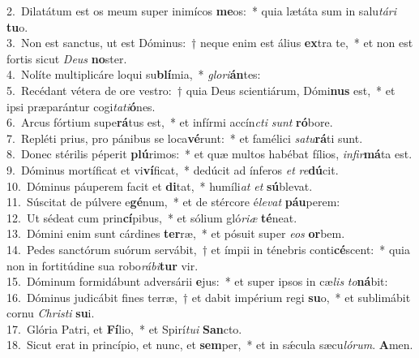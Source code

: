 {2.~}Dilatátum est os meum super inimícos \textbf{me}os:~* quia lætáta sum in salu\textit{tá}\textit{ri} \textbf{tu}o.\\
{3.~}Non est sanctus, ut est Dóminus:~† neque enim est álius \textbf{ex}tra te,~* et non est fortis sicut \textit{De}\textit{us} \textbf{no}ster.\\
{4.~}Nolíte multiplicáre loqui su\textbf{blí}mia,~* \textit{glo}\textit{ri}\textbf{án}tes:\\
{5.~}Recédant vétera de ore vestro:~† quia Deus scientiárum, Dómi\textbf{nus} est,~* et ipsi præparántur cogi\textit{ta}\textit{ti}\textbf{ó}nes.\\
{6.~}Arcus fórtium supe\textbf{rá}tus est,~* et infírmi accín\textit{cti} \textit{sunt} \textbf{ró}bore.\\
{7.~}Repléti prius, pro pánibus se loca\textbf{vé}runt:~* et famélici \textit{sa}\textit{tu}\textbf{rá}ti sunt.\\
{8.~}Donec stérilis péperit \textbf{plú}rimos:~* et quæ multos habébat fílios, \textit{in}\textit{fir}\textbf{má}ta est.\\
{9.~}Dóminus mortíficat et vi\textbf{ví}ficat,~* dedúcit ad ínferos \textit{et} \textit{re}\textbf{dú}cit.\\
{10.~}Dóminus páuperem facit et \textbf{di}tat,~* humíli\textit{at} \textit{et} \textbf{sú}blevat.\\
{11.~}Súscitat de púlvere e\textbf{gé}num,~* et de stércore é\textit{le}\textit{vat} \textbf{páu}perem:\\
{12.~}Ut sédeat cum prin\textbf{cí}pibus,~* et sólium gló\textit{ri}\textit{æ} \textbf{té}neat.\\
{13.~}Dómini enim sunt cárdines \textbf{ter}ræ,~* et pósuit super \textit{e}\textit{os} \textbf{or}bem.\\
{14.~}Pedes sanctórum suórum servábit,~† et ímpii in ténebris conti\textbf{cé}scent:~* quia non in fortitúdine sua robo\textit{rá}\textit{bi}\textbf{tur} vir.\\
{15.~}Dóminum formidábunt adversárii \textbf{e}jus:~* et super ipsos in cæ\textit{lis} \textit{to}\textbf{ná}bit:\\
{16.~}Dóminus judicábit fines terræ,~† et dabit impérium regi \textbf{su}o,~* et sublimábit cornu \textit{Chri}\textit{sti} \textbf{su}i.\\
{17.~}Glória Patri, et \textbf{Fí}lio,~* et Spirí\textit{tu}\textit{i} \textbf{San}cto.\\
{18.~}Sicut erat in princípio, et nunc, et \textbf{sem}per,~* et in sǽcula sæcu\textit{ló}\textit{rum}. \textbf{A}men.\\
